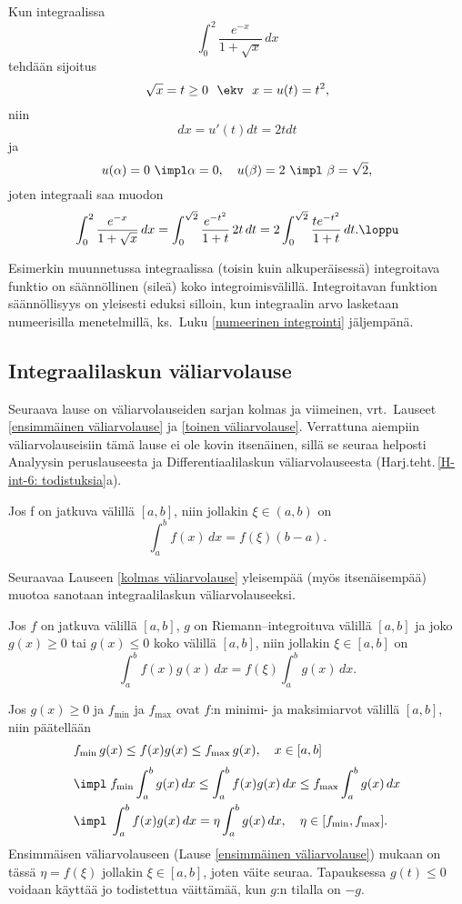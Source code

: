 \begin{Exa}
Kun integraalissa
\[
\int_0^2 \frac{e^{-x}}{1+\sqrt{x}}\, dx
\]
tehdään sijoitus
\[
\sqrt{x}=t \ge 0\ \ \ekv\ \ x=u(t)=t^2,
\]
niin
\[
dx=u'(t)dt=2tdt
\]
ja
\[
u(\alpha)=0\ \impl \alpha=0, \quad u(\beta)=2\ \impl\ \beta=\sqrt{2},
\]
joten integraali saa muodon
\[
\int_0^2 \frac{e^{-x}}{1+\sqrt{x}}\, dx=\int_0^{\sqrt{2}} \frac{e^{-t^2}}{1+t}\,2t\,dt
                                       =2\int_0^{\sqrt{2}} \frac{te^{-t^2}}{1+t}\,dt. \loppu
\]
\end{Exa}
Esimerkin muunnetussa integraalissa (toisin kuin alkuperäisessä) integroitava funktio on 
säännöllinen (sileä) koko integroimisvälillä. Integroitavan funktion säännöllisyys on yleisesti
eduksi silloin, kun integraalin arvo lasketaan numeerisilla menetelmillä, ks.\ Luku 
\ref{numeerinen integrointi} jäljempänä.

\subsection{Integraalilaskun väliarvolause}

Seuraava lause on väliarvolauseiden sarjan kolmas ja viimeinen, vrt.\ Lauseet 
\ref{ensimmäinen väliarvolause} ja \ref{toinen väliarvolause}. Verrattuna aiempiin
väliarvolauseisiin tämä lause ei ole kovin itsenäinen, sillä se seuraa helposti Analyysin
peruslauseesta ja Differentiaalilaskun väliarvolauseesta
(Harj.teht.\,\ref{H-int-6: todistuksia}a).
\begin{Lause} \label{kolmas väliarvolause} 
 
Jos f on jatkuva välillä $[a,b]$, niin jollakin $\xi\in(a,b)$ on
\[
\int_a^b f(x)\,dx = f(\xi)(b-a).
\]
\end{Lause}
Seuraavaa Lauseen \ref{kolmas väliarvolause} yleisempää (myös itsenäisempää) muotoa sanotaan
integraalilaskun  väliarvolauseeksi.
\begin{Lause} \label{kolmas väliarvolause - yleistys}
Jos $f$ on jatkuva välillä $[a,b]$, $g$ on Riemann--integroituva välillä $[a,b]$ ja joko
$g(x) \ge 0$ tai $g(x) \le 0$ koko välillä $[a,b]$, niin jollakin $\xi \in[a,b]$ on
\[
\int_a^b f(x)g(x)\,dx=f(\xi)\int_a^b g(x)\,dx.
\]
\end{Lause}
\tod Jos $g(x)\geq 0$ ja $f_{\text{min}}$ ja $f_{\text{max}}$ ovat $f$:n minimi- ja maksimiarvot
välillä $[a,b]$, niin päätellään
\begin{align*}
&f_{\text{min}}\,g(x) \le f(x)g(x) \le f_{\text{max}}\,g(x),\quad x\in [a,b] \\[1mm]
&\impl\; f_{\text{min}} \int_a^b g(x)\,dx \le \int_a^b f(x)g(x)\,dx 
                                  \le f_{\text{max}} \int_a^b g(x)\,dx \\
&\impl\; \int_a^b f(x)g(x)\,dx = \eta \int_a^b g(x)\,dx, \quad 
                                    \eta\in [f_{\text{min}},f_{\text{max}}]. 
\end{align*}
Ensimmäisen väliarvolauseen (Lause \ref{ensimmäinen väliarvolause}) mukaan on tässä 
$\eta=f(\xi)$ jollakin $\xi\in [a,b]$, joten väite seuraa. Tapauksessa $g(t)\leq 0$ voidaan
käyttää jo todistettua väittämää, kun $g$:n tilalla on $-g$. \loppu

